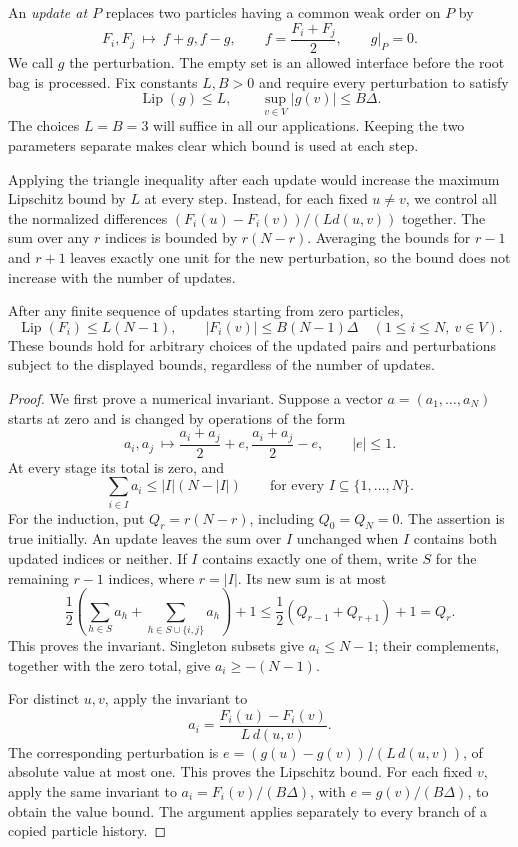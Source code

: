 An \emph{update at $P$} replaces two particles having a common weak order
on $P$ by
\[
 F_i,F_j\ \longmapsto\ f+g,f-g,
 \qquad f=\frac{F_i+F_j}{2},\qquad g|_P=0.
\]
We call $g$ the perturbation.  The empty set is an allowed interface before
the root bag is processed.  Fix constants $L,B>0$ and require every
perturbation to satisfy
\[
 \operatorname{Lip}(g)\le L,
 \qquad
 \sup_{v\in V}|g(v)|\le B\Delta.
\]
The choices $L=B=3$ will suffice in all our applications.  Keeping the two
parameters separate makes clear which bound is used at each step.

Applying the triangle inequality after each update would increase the
maximum Lipschitz bound by $L$ at every step.  Instead, for each fixed
$u\ne v$, we control all the normalized differences
$(F_i(u)-F_i(v))/(L d(u,v))$ together.  The sum over any $r$ indices is
bounded by $r(N-r)$.  Averaging the bounds for $r-1$ and $r+1$ leaves
exactly one unit for the new perturbation, so the bound does not
increase with the number of updates.

\begin{lemma}
\label{lem:particle-bounds}
After any finite sequence of updates starting from zero particles,
\[
 \operatorname{Lip}(F_i)\le L(N-1),
 \qquad
 |F_i(v)|\le B(N-1)\Delta
 \quad (1\le i\le N,\ v\in V).
\]
These bounds hold for arbitrary choices of the updated pairs and
perturbations subject to the displayed bounds, regardless of the number
of updates.
\end{lemma}

\begin{proof}
We first prove a numerical invariant.  Suppose a vector
$a=(a_1,\ldots,a_N)$ starts at zero and is changed by operations of the
form
\[
 a_i,a_j\ \longmapsto\frac{a_i+a_j}{2}+e,
                         \frac{a_i+a_j}{2}-e,
 \qquad |e|\le1.
\]
At every stage its total is zero, and
\[
 \sum_{i\in I}a_i\le |I|(N-|I|)
 \qquad\text{for every }I\subseteq\{1,\ldots,N\}.
\]
For the induction, put $Q_r=r(N-r)$, including $Q_0=Q_N=0$.
The assertion is true initially.  An update leaves the sum over $I$
unchanged when $I$ contains both updated indices or neither.  If $I$
contains exactly one of them, write $S$ for the remaining $r-1$ indices,
where $r=|I|$.  Its new sum is at most
\[
 \frac12\left(\sum_{h\in S}a_h+
                   \sum_{h\in S\cup\{i,j\}}a_h\right)+1
 \le\frac12(Q_{r-1}+Q_{r+1})+1
 =Q_r.
\]
This proves the invariant.  Singleton subsets give $a_i\le N-1$; their
complements, together with the zero total, give $a_i\ge-(N-1)$.

For distinct $u,v$, apply the invariant to
\[
 a_i=\frac{F_i(u)-F_i(v)}{L\,d(u,v)}.
\]
The corresponding perturbation is
$e=(g(u)-g(v))/(L\,d(u,v))$, of absolute value at most one.  This proves
the Lipschitz bound.  For each fixed $v$, apply the same invariant to
$a_i=F_i(v)/(B\Delta)$, with $e=g(v)/(B\Delta)$, to obtain the value
bound.  The argument applies separately to every branch of a copied
particle history.
\end{proof}

